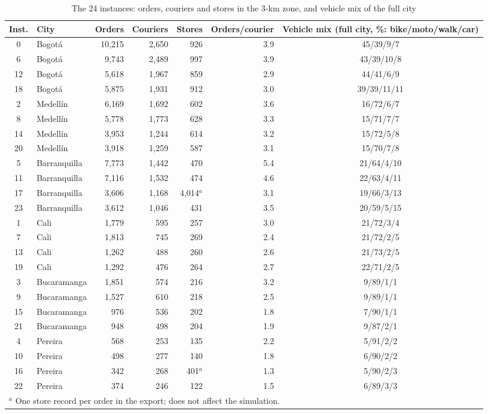 \documentclass[a4paper,11pt,review,3p,authoryear]{elsarticle}
\begin{document}
\begin{table}[htbp]
\centering
\scriptsize
\setlength{\tabcolsep}{4pt}
\renewcommand{\arraystretch}{1.1}
\begin{adjustbox}{max width=\textwidth}
\begin{tabular}{cl|rrrr|c}
\hline
\textbf{Inst.} & \textbf{City} & \textbf{Orders} & \textbf{Couriers} & \textbf{Stores} & \textbf{Orders/courier} & \textbf{Vehicle mix (full city, \%: bike/moto/walk/car)} \\
\hline
0 & Bogot\'a & 10{,}215 & 2{,}650 & 926 & 3.9 & 45/39/9/7 \\
6 & Bogot\'a & 9{,}743 & 2{,}489 & 997 & 3.9 & 43/39/10/8 \\
12 & Bogot\'a & 5{,}618 & 1{,}967 & 859 & 2.9 & 44/41/6/9 \\
18 & Bogot\'a & 5{,}875 & 1{,}931 & 912 & 3.0 & 39/39/11/11 \\
2 & Medell\'in & 6{,}169 & 1{,}692 & 602 & 3.6 & 16/72/6/7 \\
8 & Medell\'in & 5{,}778 & 1{,}773 & 628 & 3.3 & 15/71/7/7 \\
14 & Medell\'in & 3{,}953 & 1{,}244 & 614 & 3.2 & 15/72/5/8 \\
20 & Medell\'in & 3{,}918 & 1{,}259 & 587 & 3.1 & 15/70/7/8 \\
5 & Barranquilla & 7{,}773 & 1{,}442 & 470 & 5.4 & 21/64/4/10 \\
11 & Barranquilla & 7{,}116 & 1{,}532 & 474 & 4.6 & 22/63/4/11 \\
17 & Barranquilla & 3{,}606 & 1{,}168 & 4{,}014$^{a}$ & 3.1 & 19/66/3/13 \\
23 & Barranquilla & 3{,}612 & 1{,}046 & 431 & 3.5 & 20/59/5/15 \\
1 & Cali & 1{,}779 & 595 & 257 & 3.0 & 21/72/3/4 \\
7 & Cali & 1{,}813 & 745 & 269 & 2.4 & 21/72/2/5 \\
13 & Cali & 1{,}262 & 488 & 260 & 2.6 & 21/73/2/5 \\
19 & Cali & 1{,}292 & 476 & 264 & 2.7 & 22/71/2/5 \\
3 & Bucaramanga & 1{,}851 & 574 & 216 & 3.2 & 9/89/1/1 \\
9 & Bucaramanga & 1{,}527 & 610 & 218 & 2.5 & 9/89/1/1 \\
15 & Bucaramanga & 976 & 536 & 202 & 1.8 & 7/90/1/1 \\
21 & Bucaramanga & 948 & 498 & 204 & 1.9 & 9/87/2/1 \\
4 & Pereira & 568 & 253 & 135 & 2.2 & 5/91/2/2 \\
10 & Pereira & 498 & 277 & 140 & 1.8 & 6/90/2/2 \\
16 & Pereira & 342 & 268 & 401$^{a}$ & 1.3 & 5/90/2/3 \\
22 & Pereira & 374 & 246 & 122 & 1.5 & 6/89/3/3 \\
\hline
\multicolumn{7}{l}{$^{a}$ One store record per order in the export; does not affect the simulation.} \\
\end{tabular}
\end{adjustbox}
\caption{The 24 instances: orders, couriers and stores in the 3-km zone, and vehicle mix of the full city}
\label{tab:instances}
\end{table}
\end{document}

